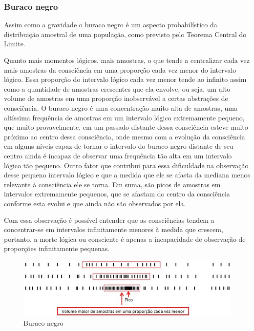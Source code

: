 \subsubsection{Buraco negro}
Assim como a gravidade o buraco negro é um aspecto probabilístico da distribuição amostral de uma população, como previsto pelo Teorema Central do Limite. 

Quanto mais momentos lógicos, mais amostras, o que tende a centralizar cada vez mais amostras da consciência em uma proporção cada vez menor do intervalo lógico. Essa proporção do intervalo lógico cada vez menor tende ao infinito assim como a quantidade de amostras crescentes que ela envolve, ou seja, um alto volume de amostras em uma proporção inobservável a certas abstrações de consciência. O buraco negro é uma concentração muito alta de amostras, uma altíssima frequência de amostras em um intervalo lógico extremamente pequeno, que muito provavelmente, em um passado distante dessa consciência esteve muito próximo ao centro dessa consciência, onde mesmo com a evolução da consciência em alguns níveis capaz de tornar o intervalo do buraco negro distante de seu centro ainda é incapaz de observar uma frequência tão alta em um intervalo lógico tão pequeno. Outro fator que contribui para essa dificuldade na observação desse pequeno intervalo lógico e que a medida que ele se afasta da mediana menos relevante à consciência ele se torna. Em suma, são picos de amostras em intervalos extremamente pequenos, que se afastam do centro da consciência conforme esta evolui e que ainda não são observados por ela.

Com essa observação é possível entender que as consciências tendem a concentrar-se em intervalos infinitamente menores à medida que crescem, portanto, a morte lógica ou consciente é apenas a incapacidade de observação de proporções infinitamente pequenas.


\begin{figure}[H]
\caption{Buraco negro}
\label{fig:consciousness_black_hole}
\centering
\includegraphics[scale=1]{sections/images/consciousness_black_hole.jpg}
\end{figure}

